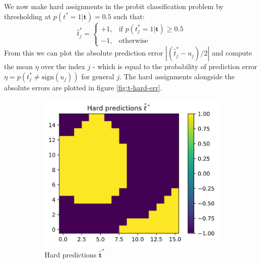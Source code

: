 \documentclass[]{article}
\newcommand{\tbold}{\boldsymbol{t}}
\begin{document}
We now make hard assignments in the probit classification problem by thresholding at $p(t^*=1 | \tbold) = 0.5$ such that:
%
\begin{equation}
	\hat{t}^*_j = 
	\begin{cases}
		+1, & \text{if } p(t^*_j = 1 | \tbold) \geq 0.5\\
		-1,              & \text{otherwise}
	\end{cases}
\end{equation}
From this we can plot the absolute prediction error $|(\hat{t}^*_j - u_j)/2|$ and compute the mean $\eta$ over the index $j$ - which is equal to the probability of prediction error $\eta = p(t^*_j \neq \textrm{sign}(u_j))$ for general $j$. The hard assignments alongside the absolute errors are plotted in figure \ref{fig:t-hard-err}.
%
\begin{figure}[!h]
	\centering
	\begin{subfigure}{0.32\linewidth}
		\includegraphics[width=\linewidth]{t-hard.png}
		\caption{Hard predictions $\hat{\tbold}^*$}
		\label{fig:t-hard}
	\end{subfigure}
	\begin{subfigure}{0.31\linewidth}

\end{subfigure}
\end{figure}
\end{document}
